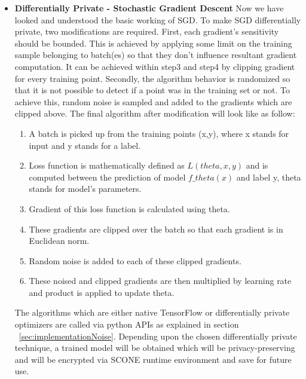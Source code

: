 \begin{itemize}
\item \textbf{Differentially Private - Stochastic Gradient Descent}
Now we have looked and understood the basic working of SGD. To make SGD differentially private, two modifications are required. First, each gradient's sensitivity should be bounded. This is achieved by applying some limit on the training sample belonging to batch(es) so that they don't influence resultant gradient computation. It can be achieved within step3 and step4 by clipping gradient for every training point. Secondly, the algorithm behavior is randomized so that it is not possible to detect if a point was in the training set or not. To achieve this, random noise is sampled and added to the gradients which are clipped above. The final algorithm after modification will look like as follow:

\begin{enumerate}
\item{A batch is picked up from the training points (x,y), where x stands for input and y stands for a label.}
\vspace{-0.3cm}\item{Loss function is mathematically defined as $L(theta, x, y)$ and is computed between the prediction of model $f\_theta(x)$ and label y, theta stands for model's parameters.}
\vspace{-0.3cm}\item{Gradient of this loss function is calculated using theta.}
\vspace{-0.3cm}\item{These gradients are clipped over the batch so that each gradient is in Euclidean norm.}
\vspace{-0.3cm}\item{Random noise is added to each of these clipped gradients.}
\vspace{-0.3cm}\item{These noised and clipped gradients are then multiplied by learning rate and product is applied to update theta.}
\end{enumerate}

The algorithms which are either native TensorFlow or differentially private optimizers are called via python APIs as explained in section ~\ref{sec:implementationNoise}. Depending upon the chosen differentially private technique, a trained model will be obtained which will be privacy-preserving and will be encrypted via SCONE runtime environment and save for future use.
\end{itemize}

